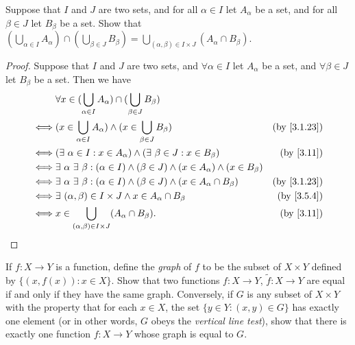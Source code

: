 \begin{ex}\label{ex:3.5.9}
  Suppose that \(I\) and \(J\) are two sets, and for all \(\alpha \in I\) let \(A_{\alpha}\) be a set, and for all \(\beta \in J\) let \(B_{\beta}\) be a set.
  Show that \((\bigcup_{\alpha \in I} A_{\alpha}) \cap (\bigcup_{\beta \in J} B_{\beta}) = \bigcup_{(\alpha, \beta) \in I \times J} (A_{\alpha} \cap B_{\beta})\).
\end{ex}

\begin{proof}
  Suppose that \(I\) and \(J\) are two sets, and \(\forall \alpha \in I\) let \(A_{\alpha}\) be a set, and \(\forall \beta \in J\) let \(B_{\beta}\) be a set.
  Then we have
  \begin{align*}
         & \forall x \in (\bigcup_{\alpha \in I} A_{\alpha}) \cap (\bigcup_{\beta \in J} B_{\beta})                                                           \\
    \iff & (x \in \bigcup_{\alpha \in I} A_{\alpha}) \land (x \in \bigcup_{\beta \in J} B_{\beta})                                & \text{(by \cref{3.1.23})} \\
    \iff & (\exists\ \alpha \in I : x \in A_{\alpha}) \land (\exists\ \beta \in J : x \in B_{\beta})                              & \text{(by \cref{3.11})}   \\
    \iff & \exists\ \alpha \ \exists\ \beta : (\alpha \in I) \land (\beta \in J) \land (x \in A_{\alpha}) \land (x \in B_{\beta})                             \\
    \iff & \exists\ \alpha \ \exists\ \beta : (\alpha \in I) \land (\beta \in J) \land (x \in A_{\alpha} \cap B_{\beta})          & \text{(by \cref{3.1.23})} \\
    \iff & \exists\ (\alpha, \beta) \in I \times J \land x \in A_{\alpha} \cap B_{\beta}                                          & \text{(by \cref{3.5.4})}  \\
    \iff & x \in \bigcup_{(\alpha, \beta) \in I \times J} (A_{\alpha} \cap B_{\beta}).                                            & \text{(by \cref{3.11})}
  \end{align*}
\end{proof}

\begin{ex}\label{ex:3.5.10}
  If \(f : X \to Y\) is a function, define the \emph{graph} of \(f\) to be the subset of \(X \times Y\) defined by \(\{(x, f(x)) : x \in X\}\).
  Show that two functions \(f : X \to Y\), \(\tilde{f} : X \to Y\) are equal if and only if they have the same graph.
  Conversely, if \(G\) is any subset of \(X \times Y\) with the property that for each \(x \in X\), the set \(\{y \in Y : (x, y) \in G\}\) has exactly one element (or in other words, \(G\) obeys the \emph{vertical line test}), show that there is exactly one function \(f : X \to Y\) whose graph is equal to \(G\).
\end{ex}

